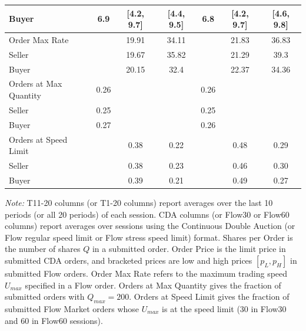 \documentclass[12pt]{article}
\begin{document}
\begin{table}[t]
{\begin{threeparttable}
\begin{tabular}{lccc|ccc}
    \hspace{3mm}Buyer               & 6.9      & [4.2, 9.7]  & [4.4, 9.5]  & 6.8      & [4.2, 9.7]  & [4.6, 9.8]  \\
   \hline
     Order Max Rate                 &          & 19.91         & 34.11         &           & 21.83         & 36.83         \\
    \hspace{3mm}Seller              &          & 19.67         & 35.82         &           & 21.29         & 39.3          \\
    \hspace{3mm}Buyer               &          & 20.15         & 32.4          &           & 22.37         & 34.36         \\
   \hline
    Orders at Max Quantity          & 0.26     &               &               & 0.26      &               &               \\
    \hspace{3mm}Seller              & 0.25     &               &               & 0.25      &               &               \\
    \hspace{3mm}Buyer               & 0.27     &               &               & 0.26      &               &               \\
   \hline
    Orders at Speed Limit      &          & 0.38          & 0.22          &           & 0.48          & 0.29          \\
    \hspace{3mm}Seller              &          & 0.38          & 0.23          &           & 0.46          & 0.30           \\
    \hspace{3mm}Buyer               &          & 0.39          & 0.21          &           & 0.49          & 0.27          \\
    \bottomrule
    \end{tabular}
\begin{tablenotes}
\footnotesize
\textit{Note:} 
T11-20 columns (or T1-20 columns) report averages over the last 10 periods (or all 20 periods) of each session. CDA columns (or Flow30 or Flow60 columns) report averages over sessions using the Continuous Double Auction (or Flow regular speed limit or Flow stress speed limit) format. Shares per Order is the number of shares $Q$ in a submitted order. Order Price is the limit price in submitted CDA orders, and bracketed prices are low and high prices $[p_L, p_H ]$ in submitted Flow orders. Order Max Rate refers to the maximum trading speed $U_{max}$ specified in a Flow order. Orders at Max Quantity gives the fraction of submitted orders with $Q_{max} = 200$. Orders at Speed Limit gives the fraction of submitted Flow Market orders whose $U_{max}$ is at the speed limit (30 in Flow30 and 60 in Flow60 sessions).

\end{tablenotes}
\end{threeparttable}}
\end{table}
\end{document}
